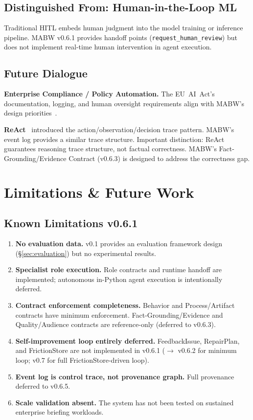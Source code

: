 \documentclass[11pt,a4paper]{article}
\begin{document}
\subsection{Distinguished From: Human-in-the-Loop ML}

Traditional HITL embeds human judgment into the model training or inference pipeline. MABW v0.6.1 provides handoff points (\texttt{request\_human\_review}) but does not implement real-time human intervention in agent execution.

\subsection{Future Dialogue}

\textbf{Enterprise Compliance / Policy Automation.} The EU~AI~Act's documentation, logging, and human oversight requirements align with MABW's design priorities~\cite{eu_ai_act}.

\textbf{ReAct}~\cite{yao2022react} introduced the action/observation/decision trace pattern. MABW's event log provides a similar trace structure. Important distinction: ReAct guarantees reasoning trace structure, not factual correctness. MABW's Fact-Grounding/Evidence Contract (v0.6.3) is designed to address the correctness gap.

\section{Limitations \& Future Work}
\label{sec:limitations}

\subsection{Known Limitations v0.6.1}

\begin{enumerate}[leftmargin=*,itemsep=2pt]
    \item \textbf{No evaluation data.} v0.1 provides an evaluation framework design (\S\ref{sec:evaluation}) but no experimental results.
    \item \textbf{Specialist role execution.} Role contracts and runtime handoff are implemented; autonomous in-Python agent execution is intentionally deferred.
    \item \textbf{Contract enforcement completeness.} Behavior and Process/Artifact contracts have minimum enforcement. Fact-Grounding/Evidence and Quality/Audience contracts are reference-only (deferred to v0.6.3).
    \item \textbf{Self-improvement loop entirely deferred.} FeedbackIssue, RepairPlan, and FrictionStore are not implemented in v0.6.1 ($\rightarrow$ v0.6.2 for minimum loop; v0.7 for full FrictionStore-driven loop).
    \item \textbf{Event log is control trace, not provenance graph.} Full provenance deferred to v0.6.5.
    \item \textbf{Scale validation absent.} The system has not been tested on sustained enterprise briefing workloads.
\end{enumerate}
\end{document}
